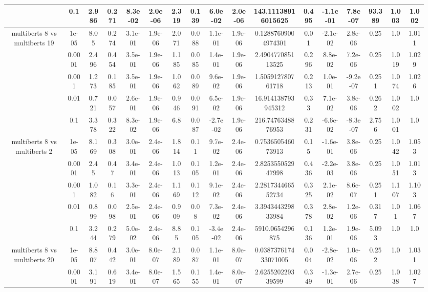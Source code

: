 \begin{tabular}{|c|c|c|c|c|c|c|c|c|c|c|c|c|c|c|c|c|}
 & 0.1 & 2.986 & 0.271 & 8.3e-02 & 2.0e-06 & 2.319 & 0.139 & 6.0e-02 & 2.0e-06 & 143.11138916015625 & 0.495 & -1.1e-01 & 7.8e-07 & 93.389 & 1.003 & 1.002 \\
\hline
\multirow{5}{*}{multiberts 8 vs multiberts 19} & 1e-05 & 8.05 & 0.274 & 3.1e-01 & 1.9e-06 & 2.071 & 0.088 & 1.1e-01 & 1.9e-06 & 0.12887609004974301 & 0.01 & -2.1e-02 & 2.8e-06 & 0.25 & 1.0 & 1.011 \\
 & 0.0001 & 2.496 & 0.454 & 3.5e-01 & 1.9e-06 & 1.185 & 0.085 & 1.4e-01 & 1.9e-06 & 2.490477085113525 & 0.296 & 8.8e-02 & 7.2e-06 & 0.25 & 1.019 & 1.029 \\
 & 0.001 & 1.273 & 0.185 & 3.5e-01 & 1.9e-06 & 1.062 & 0.089 & 9.6e-02 & 1.9e-06 & 1.505912780761718 & 0.213 & 1.0e-01 & -9.2e-07 & 0.251 & 1.074 & 1.026 \\
 & 0.01 & 0.721 & 0.057 & 2.6e-01 & 1.9e-06 & 0.946 & 0.091 & 6.5e-02 & 1.9e-06 & 16.914138793945312 & 0.33 & 7.1e-02 & 3.8e-06 & 0.262 & 1.002 & 1.0 \\
 & 0.1 & 3.378 & 0.322 & 8.3e-02 & 1.9e-06 & 6.8 & 0.087 & -2.7e-02 & 1.9e-06 & 216.7476348876953 & 0.231 & -6.6e-02 & -8.3e-07 & 2.756 & 1.001 & 1.0 \\
\hline
\multirow{5}{*}{multiberts 8 vs multiberts 2} & 1e-05 & 8.169 & 0.308 & 3.0e-01 & 2.4e-06 & 1.814 & 0.11 & 9.7e-02 & 2.4e-06 & 0.753650546073913 & 0.15 & -1.6e-01 & 3.8e-06 & 0.25 & 1.042 & 1.053 \\
 & 0.0001 & 2.45 & 0.47 & 3.4e-01 & 2.4e-06 & 1.013 & 0.105 & 1.2e-01 & 2.4e-06 & 2.825355052947998 & 0.436 & -2.2e-03 & 3.8e-06 & 0.25 & 1.051 & 1.013 \\
 & 0.001 & 1.082 & 0.16 & 3.3e-01 & 2.4e-06 & 1.169 & 0.112 & 9.1e-02 & 2.4e-06 & 2.281734466552734 & 0.325 & 2.1e-02 & 8.6e-07 & 0.251 & 1.107 & 1.103 \\
 & 0.01 & 0.899 & 0.098 & 2.5e-01 & 2.4e-06 & 0.909 & 0.08 & 7.3e-02 & 2.4e-06 & 3.394344329833984 & 0.378 & 2.8e-02 & 1.2e-06 & 0.317 & 1.01 & 1.067 \\
 & 0.1 & 3.244 & 0.279 & 5.0e-02 & 2.4e-06 & 8.85 & 0.105 & -3.4e-02 & 2.4e-06 & 5910.0654296875 & 0.136 & 1.2e-01 & 1.9e-06 & 5.093 & 1.0 & 1.0 \\
\hline
\multirow{5}{*}{multiberts 8 vs multiberts 20} & 1e-05 & 8.807 & 0.442 & 3.0e-01 & 8.0e-07 & 2.189 & 0.087 & 1.1e-01 & 8.0e-07 & 0.038737617433071005 & 0.004 & -2.8e-02 & 1.0e-06 & 0.252 & 1.0 & 1.031 \\
 & 0.0001 & 3.191 & 0.619 & 3.4e-01 & 8.0e-07 & 1.565 & 0.155 & 1.4e-01 & 8.0e-07 & 2.625520229339599 & 0.349 & -1.3e-01 & 2.7e-06 & 0.25 & 1.038 & 1.027 \\

\end{tabular}
